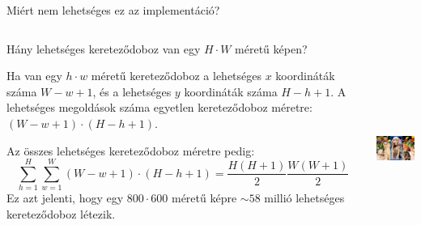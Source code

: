 \documentclass[english, aspectratio=169]{beamer}
\begin{document}
\begin{frame}{Miért nem lehetséges ez az implementáció?}
\begin{columns}
\begin{column}{.7\textwidth}
Hány lehetséges kereteződoboz van egy $H \cdot W$ méretű képen?\par\medskip
Ha van egy $h \cdot w$ méretű kereteződoboz a lehetséges $x$ koordináták száma $W-w+1$, és a lehetséges $y$ koordináták száma $H-h+1$. A lehetséges megoldások száma egyetlen kereteződoboz méretre: $(W-w+1) \cdot (H-h+1)$.\par\medskip
Az összes lehetséges kereteződoboz méretre pedig:
\[
\sum_{h=1}^H \sum_{w=1}^W (W-w+1) \cdot (H-h+1) = \frac{H(H+1)}{2} \frac{W(W+1)}{2}
\]
Ez azt jelenti, hogy egy $800 \cdot 600$ méretű képre $\sim 58$ millió lehetséges kereteződoboz létezik.
\end{column}
\begin{column}{.3\textwidth}
\begin{center}
\includegraphics[height=7cm, width=4cm, keepaspectratio]{images/od_7.png}
\end{center}
\end{column}
\end{columns}
\end{frame}
\end{document}
